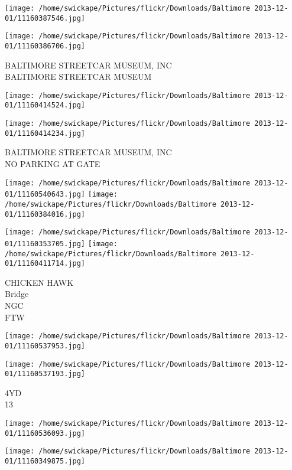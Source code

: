 \documentclass[10pt,letterpaper]{article}
\begin{document}
\texttt{[image: /home/swickape/Pictures/flickr/Downloads/Baltimore 2013-12-01/11160387546.jpg]}

\vspace{0.25in}
\texttt{[image: /home/swickape/Pictures/flickr/Downloads/Baltimore 2013-12-01/11160386706.jpg]}

BALTIMORE STREETCAR MUSEUM, INC\\
BALTIMORE STREETCAR MUSEUM
\pagebreak

\texttt{[image: /home/swickape/Pictures/flickr/Downloads/Baltimore 2013-12-01/11160414524.jpg]}

\vspace{0.25in}
\texttt{[image: /home/swickape/Pictures/flickr/Downloads/Baltimore 2013-12-01/11160414234.jpg]}

BALTIMORE STREETCAR MUSEUM, INC\\
NO PARKING AT GATE
\pagebreak

\texttt{[image: /home/swickape/Pictures/flickr/Downloads/Baltimore 2013-12-01/11160540643.jpg]}
\texttt{[image: /home/swickape/Pictures/flickr/Downloads/Baltimore 2013-12-01/11160384016.jpg]}

\texttt{[image: /home/swickape/Pictures/flickr/Downloads/Baltimore 2013-12-01/11160353705.jpg]}
\texttt{[image: /home/swickape/Pictures/flickr/Downloads/Baltimore 2013-12-01/11160411714.jpg]}

CHICKEN HAWK\\
Bridge\\
NGC\\
FTW
\pagebreak

\texttt{[image: /home/swickape/Pictures/flickr/Downloads/Baltimore 2013-12-01/11160537953.jpg]}

\vspace{0.25in}
\texttt{[image: /home/swickape/Pictures/flickr/Downloads/Baltimore 2013-12-01/11160537193.jpg]}

4YD\\
13
\pagebreak

\texttt{[image: /home/swickape/Pictures/flickr/Downloads/Baltimore 2013-12-01/11160536093.jpg]}

\vspace{0.25in}
\texttt{[image: /home/swickape/Pictures/flickr/Downloads/Baltimore 2013-12-01/11160349875.jpg]}
\end{document}
